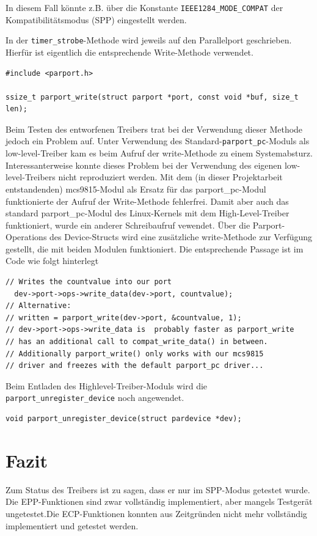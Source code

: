 \documentclass[a4paper,11pt]{article}
\begin{document}
In diesem Fall könnte z.B. über die Konstante \verb|IEEE1284_MODE_COMPAT| der Kompatibilitätsmodus (SPP) eingestellt werden. 

In der \verb|timer_strobe|-Methode wird jeweils auf den Parallelport geschrieben. Hierfür ist eigentlich die entsprechende Write-Methode verwendet.

\begin{verbatim}
#include <parport.h>

ssize_t parport_write(struct parport *port, const void *buf, size_t len);
\end{verbatim}

Beim Testen des entworfenen Treibers trat bei der Verwendung dieser Methode jedoch ein Problem auf. Unter Verwendung des Standard-\verb|parport_pc|-Moduls als low-level-Treiber kam es beim Aufruf der write-Methode zu einem Systemabsturz. Interessanterweise konnte dieses Problem bei der Verwendung des eigenen low-level-Treibers nicht reproduziert werden. Mit dem (in dieser Projektarbeit entstandenden) mcs9815-Modul als Ersatz für das parport\_pc-Modul funktionierte der Aufruf der Write-Methode fehlerfrei. Damit aber auch das standard parport\_pc-Modul des Linux-Kernels mit dem High-Level-Treiber funktioniert, wurde ein anderer Schreibaufruf vewendet. Über die Parport-Operations des Device-Structs wird eine zusätzliche write-Methode zur Verfügung gestellt, die mit beiden Modulen funktioniert. Die entsprechende Passage ist im Code wie folgt hinterlegt

\begin{verbatim}
// Writes the countvalue into our port
  dev->port->ops->write_data(dev->port, countvalue);
// Alternative:
// written = parport_write(dev->port, &countvalue, 1);
// dev->port->ops->write_data is  probably faster as parport_write 
// has an additional call to compat_write_data() in between. 
// Additionally parport_write() only works with our mcs9815 
// driver and freezes with the default parport_pc driver...
\end{verbatim}

Beim Entladen des Highlevel-Treiber-Moduls wird die \verb|parport_unregister_device| noch angewendet.

\begin{verbatim}
void parport_unregister_device(struct pardevice *dev);
\end{verbatim}

\section{Fazit}

Zum Status des Treibers ist zu sagen, dass er nur im SPP-Modus getestet wurde. Die EPP-Funktionen sind zwar vollständig implementiert, aber mangels Testgerät ungetestet.Die ECP-Funktionen konnten aus Zeitgründen nicht mehr vollständig implementiert und getestet werden.


\end{document}
